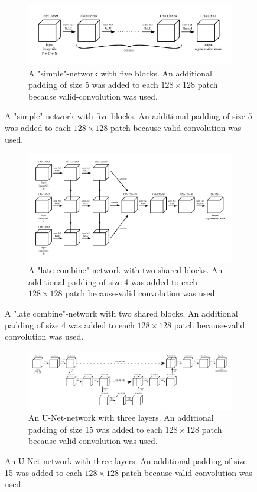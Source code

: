 \begin{figure}[H]
	\centering
	\begin{subfigure}{.70\textwidth}
		\centering
		\includegraphics[width=\linewidth]{models_flow/early_combine.png}
		\caption[figure]{A "simple"-network with five blocks. An additional padding of size 5 was added to each $128\times128$ patch because valid-convolution was used.}
		\label{fig:flow_early_combine}
	\end{subfigure}
\end{figure}
\begin{figure}[H]
  \ContinuedFloat
  \centering	
	\begin{subfigure}{.95\textwidth}
		\centering
	\includegraphics[width=\linewidth]{models_flow/late_combine.png}
	\caption[figure]{A "late combine"-network with two shared blocks. An additional padding of size 4 was added to each $128\times128$ patch because-valid convolution was used.}
	\label{fig:flow_late_combine}
	\end{subfigure}
\end{figure}
\begin{figure}[H]
  \ContinuedFloat
  \centering	
		\begin{subfigure}{.95\textwidth}
		\centering
		\includegraphics[width=\linewidth]{models_flow/unet.png}
	\caption[figure]{An U-Net-network with three layers. An additional padding of size 15 was added to each $128\times128$ patch because valid convolution was used.}
	
	\label{fig:flow_unet}
	\end{subfigure}
		\end{figure}
